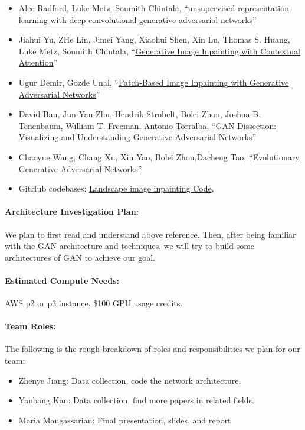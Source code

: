 \documentclass[11pt]{article}
\begin{document}
\begin{itemize} 
\item Alec Radford, Luke Metz, Soumith Chintala, ``\href{https://arxiv.org/pdf/1511.06434.pdf}{unsupervised representation learning with deep convolutional generative adversarial networks}'' 
\item Jiahui Yu, ZHe Lin, Jimei Yang, Xiaohui Shen, Xin Lu, Thomas S. Huang, Luke Metz, Soumith Chintala, ``\href{http://openaccess.thecvf.com/content_cvpr_2018/papers/Yu_Generative_Image_Inpainting_CVPR_2018_paper.pdf}{Generative Image Inpainting with Contextual Attention}'' 
\item Ugur Demir, Gozde Unal, ``\href{https://arxiv.org/pdf/1803.07422.pdf}{Patch-Based Image Inpainting with Generative Adversarial Networks}'' 
\item David Bau, Jun-Yan Zhu, Hendrik Strobelt, Bolei Zhou, Joshua B. Tenenbaum, William T. Freeman, Antonio Torralba, ``\href{https://arxiv.org/pdf/1811.10597.pdf}{GAN Dissection: Visualizing and Understanding Generative Adversarial Networks}'' 
\item Chaoyue Wang,  Chang Xu, Xin Yao, Bolei Zhou,Dacheng Tao, ``\href{https://arxiv.org/pdf/1803.00657.pdf}{Evolutionary Generative Adversarial Networks}'' 

\item GitHub codebases: \href{https://github.com/tron32213021/ee599-GAN-Project} {Landscape image inpainting Code},  
\end{itemize} 


\paragraph{Architecture Investigation Plan:}  We plan to first read and understand above reference. Then, after being familiar with the GAN architecture and techniques, we will try to build some architectures of GAN to achieve our goal.

\paragraph{Estimated Compute Needs:}  AWS p2 or p3 instance, \$100 GPU usage credits. 

\paragraph{Team Roles:} The following is the rough breakdown of roles and responsibilities we plan for our team:
\begin{itemize}
\item Zhenye Jiang: Data collection, code the network architecture.
\item Yanbang Kan: Data collection, find more papers in related fields.
\item Maria Mangassarian: Final presentation, slides, and report
\end{itemize}


 
\end{document}
